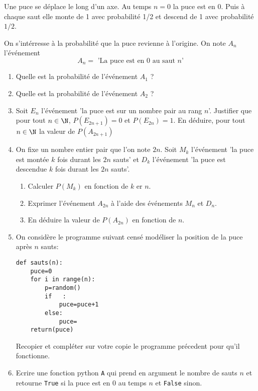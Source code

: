 \documentclass[a4paper, 11pt,reqno]{article}
\begin{document}
\vspace{
0.5cm}
\newpage
\begin{exercice}
Une puce se déplace le long d'un axe. Au temps $n=0$ la puce est en 0. Puis à chaque saut elle monte de 1 avec probabilité 1/2 et descend de 1 avec probabilité $1/2$.  


 On s'intérresse à la probabilité que la puce revienne à l'origine. On note $A_n$ l'événement 
 $$A_n=\text{ 'La puce est en 0 au saut $n$'}$$

 \begin{enumerate}
  \item Quelle est la probabilité de l'événement  $A_1$ ? 
 \item Quelle est la probabilité de l'événement  $A_2$ ? 
 \item Soit $E_n$ l'événement 'la puce est sur un nombre pair au rang $n$'. Justifier que pour tout $n\in \N$, $P(E_{2n+1}) =0$ et $P(E_{2n}) =1$. En déduire, pour tout $n\in \N$ la valeur de $P(A_{2n+1})$
 \item On fixe un nombre entier pair que l'on note $2n$.   Soit $M_{k}$ l'événement 'la puce est montée $k$ fois durant les $2n$ sauts' et  $D_k$ l'événement 'la puce est descendue $k$ fois durant les $2n$ sauts'.
 \begin{enumerate}
 \item Calculer $P(M_k)$ en fonction de $k$ er $n$. 
 \item Exprimer l'événement $A_{2n}$ à l'aide des événements $M_n$ et $D_n$.
 \item En déduire la valeur de  $P(A_{2n})$ en fonction de $n$.
\end{enumerate}
 
\item On considère le programme suivant censé modéliser la position de la puce après $n$ sauts:
\begin{lstlisting}
def sauts(n):
    puce=0
    for i in range(n):
        p=random()
        if   :
            puce=puce+1
        else:
            puce=
    return(puce)
\end{lstlisting}

Recopier et compléter sur votre copie le programme précedent pour qu'il fonctionne. 
\item Ecrire une fonction python \texttt{A} qui prend en argument le nombre de sauts $n$ et retourne \texttt{True} si la puce est en $0$ au temps $n$ et \texttt{False} sinon. 


\end{enumerate}
\end{exercice}
\end{document}
